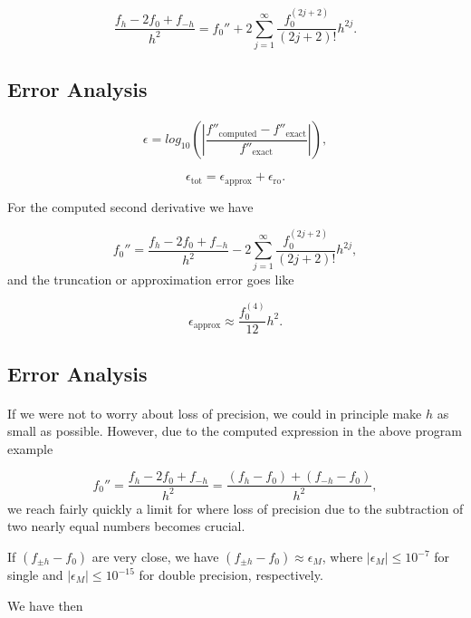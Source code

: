 \documentclass[%
oneside,                 %
final,                   %
10pt]{article}
\begin{document}
{{{{{{\[
 \frac{ f_h -2f_0 +f_{-h}}{h^2}=f_0''+2\sum_{j=1}^{\infty}\frac{f_0^{(2j+2)}}{(2j+2)!}h^{2j}.
\]



\subsection{Error Analysis}


\paragraph{}
\[
   \epsilon=log_{10}\left(\left|\frac{f''_{\mbox{computed}}-f''_{\mbox{exact}}}
                 {f''_{\mbox{exact}}}\right|\right),
\]

\[
   \epsilon_{\mbox{tot}}=\epsilon_{\mbox{approx}}+\epsilon_{\mbox{ro}}.
\]

For the computed second derivative  we have

\[
 f_0''=\frac{ f_h -2f_0 +f_{-h}}{h^2}-2\sum_{j=1}^{\infty}\frac{f_0^{(2j+2)}}{(2j+2)!}h^{2j},
\]
and the truncation or approximation error goes like

\[
  \epsilon_{\mbox{approx}}\approx \frac{f_0^{(4)}}{12}h^{2}.
\]



\subsection{Error Analysis}


\paragraph{}
If we were not to worry about loss of precision, we could in principle
make $h$ as small as possible.
However, due to the computed expression in the above program example

\[
 f_0''=\frac{ f_h -2f_0 +f_{-h}}{h^2}=\frac{ (f_h -f_0) +(f_{-h}-f_0)}{h^2},
\]
we reach fairly quickly a limit for where loss of precision due to the subtraction
of two nearly equal numbers becomes crucial.

If $(f_{\pm h} -f_0)$ are very close, we have
$(f_{\pm h} -f_0)\approx \epsilon_M$, where $|\epsilon_M|\le 10^{-7}$ for single and
$|\epsilon_M|\le 10^{-15}$ for double precision, respectively.

We have then

}}}}}}
\end{document}
